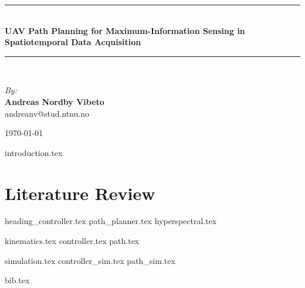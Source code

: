 \documentclass{article}
\newcommand{\HRule}{\rule{\linewidth}{0.5mm}}
\numberwithin{equation}{section}
\begin{document}
\begin{center}
\HRule \\[0.4cm]
{ \huge \bfseries UAV Path Planning for Maximum-Information Sensing in Spatiotemporal Data Acquisition}
\HRule \\[1.5cm]

\begin{center} \large
\emph{By:}\\
\textbf{Andreas Nordby Vibeto}\\
andreanv@stud.ntnu.no
\end{center}

\vfill

{\large \monthyear\today}

\end{center}
\newpage

\tableofcontents

\newpage


{introduction.tex}
\newpage
\section{Literature Review}
{heading_controller.tex}
{path_planner.tex}
{hyperspectral.tex}

{kinematics.tex}
{controller.tex}
{path.tex}

{simulation.tex}
{controller_sim.tex}
{path_sim.tex}


\newpage
{bib.tex}
\end{document}

